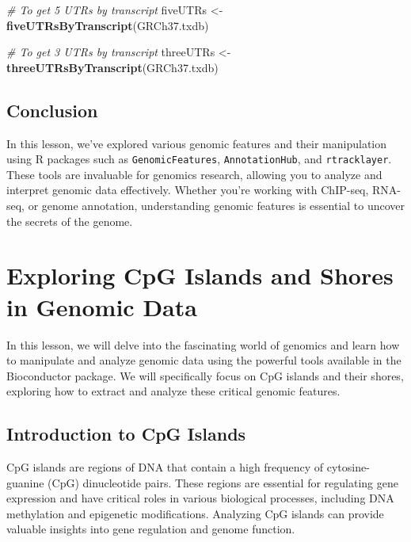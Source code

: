 \documentclass[
]{book}
\newenvironment{Shaded}{\begin{snugshade}}{\end{snugshade}}
\newcommand{\CommentTok}[1]{\textcolor[rgb]{0.56,0.35,0.01}{\textit{#1}}}
\newcommand{\FunctionTok}[1]{\textcolor[rgb]{0.13,0.29,0.53}{\textbf{#1}}}
\newcommand{\NormalTok}[1]{#1}
\newcommand{\OtherTok}[1]{\textcolor[rgb]{0.56,0.35,0.01}{#1}}
\begin{document}
\begin{Shaded}
\begin{Highlighting}[]
\CommentTok{\# To get 5\textquotesingle{} UTRs by transcript}
\NormalTok{fiveUTRs }\OtherTok{\textless{}{-}} \FunctionTok{fiveUTRsByTranscript}\NormalTok{(GRCh37.txdb)}

\CommentTok{\# To get 3\textquotesingle{} UTRs by transcript}
\NormalTok{threeUTRs }\OtherTok{\textless{}{-}} \FunctionTok{threeUTRsByTranscript}\NormalTok{(GRCh37.txdb)}
\end{Highlighting}
\end{Shaded}

\hypertarget{conclusion-27}{%
\subsection{Conclusion}\label{conclusion-27}}

In this lesson, we've explored various genomic features and their manipulation using R packages such as \texttt{GenomicFeatures}, \texttt{AnnotationHub}, and \texttt{rtracklayer}. These tools are invaluable for genomics research, allowing you to analyze and interpret genomic data effectively. Whether you're working with ChIP-seq, RNA-seq, or genome annotation, understanding genomic features is essential to uncover the secrets of the genome.

\hypertarget{exploring-cpg-islands-and-shores-in-genomic-data}{%
\section{Exploring CpG Islands and Shores in Genomic Data}\label{exploring-cpg-islands-and-shores-in-genomic-data}}

In this lesson, we will delve into the fascinating world of genomics and learn how to manipulate and analyze genomic data using the powerful tools available in the Bioconductor package. We will specifically focus on CpG islands and their shores, exploring how to extract and analyze these critical genomic features.

\hypertarget{introduction-to-cpg-islands}{%
\subsection{Introduction to CpG Islands}\label{introduction-to-cpg-islands}}

CpG islands are regions of DNA that contain a high frequency of cytosine-guanine (CpG) dinucleotide pairs. These regions are essential for regulating gene expression and have critical roles in various biological processes, including DNA methylation and epigenetic modifications. Analyzing CpG islands can provide valuable insights into gene regulation and genome function.
\end{document}
